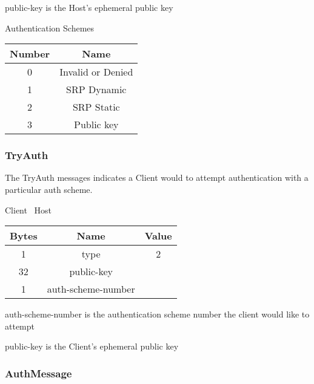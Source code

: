 public-key is the Host's ephemeral public key

\begin{center}
    Authentication Schemes\\
    \begin{tabular}{|c|c|}
        \hline
        \textbf{Number} & \textbf{Name}     \\
        \hline
        0               & Invalid or Denied \\
        \hline
        1               & SRP Dynamic       \\
        \hline
        2               & SRP Static        \\
        \hline
        3               & Public key        \\
        \hline
    \end{tabular}
\end{center}

\subsubsection{TryAuth}

The TryAuth messages indicates a Client would to attempt authentication with a particular auth scheme.

\begin{center}
    Client \textrightarrow\ Host\\
    \begin{tabular}{|c|c|c|}
        \hline
        \textbf{Bytes} & \textbf{Name}      & \textbf{Value} \\
        \hline
        1              & type               & 2              \\
        \hline
        32               & public-key       &                \\
        \hline
        1              & auth-scheme-number &                \\
        \hline
    \end{tabular}
\end{center}

auth-scheme-number is the authentication scheme number the client would like to attempt

public-key is the Client's ephemeral public key

\subsubsection{AuthMessage}

